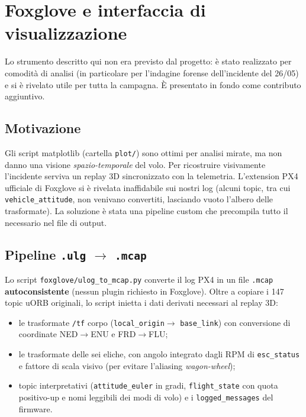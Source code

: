 \chapter{Foxglove e interfaccia di visualizzazione}
\label{cap:foxglove}

\begin{notabox}
Lo strumento descritto qui non era previsto dal progetto: \`e stato realizzato per
comodit\`a di analisi (in particolare per l'indagine forense dell'incidente del
26/05) e si \`e rivelato utile per tutta la campagna. \`E presentato in fondo come
contributo aggiuntivo.
\end{notabox}

\section{Motivazione}

Gli script matplotlib (cartella \texttt{plot/}) sono ottimi per analisi mirate,
ma non danno una visione \emph{spazio-temporale} del volo. Per ricostruire
visivamente l'incidente serviva un replay 3D sincronizzato con la telemetria.
L'extension PX4 ufficiale di Foxglove si \`e rivelata inaffidabile sui nostri log
(alcuni topic, tra cui \texttt{vehicle\_attitude}, non venivano convertiti,
lasciando vuoto l'albero delle trasformate). La soluzione \`e stata una pipeline
custom che precompila tutto il necessario nel file di output.

\section{Pipeline \texttt{.ulg} $\rightarrow$ \texttt{.mcap}}

Lo script \texttt{foxglove/ulog\_to\_mcap.py} converte il log PX4 in un file
\texttt{.mcap} \textbf{autoconsistente} (nessun plugin richiesto in Foxglove).
Oltre a copiare i 147 topic uORB originali, lo script inietta i dati derivati
necessari al replay 3D:

\begin{itemize}
  \item le trasformate \texttt{/tf} corpo (\texttt{local\_origin}$\rightarrow$
        \texttt{base\_link}) con conversione di coordinate NED$\rightarrow$ENU e
        FRD$\rightarrow$FLU;
  \item le trasformate delle sei eliche, con angolo integrato dagli RPM di
        \texttt{esc\_status} e fattore di scala visivo (per evitare l'aliasing
        \emph{wagon-wheel});
  \item topic interpretativi (\texttt{attitude\_euler} in gradi,
        \texttt{flight\_state} con quota positivo-up e nomi leggibili dei modi di
        volo) e i \texttt{logged\_messages} del firmware.
\end{itemize}


